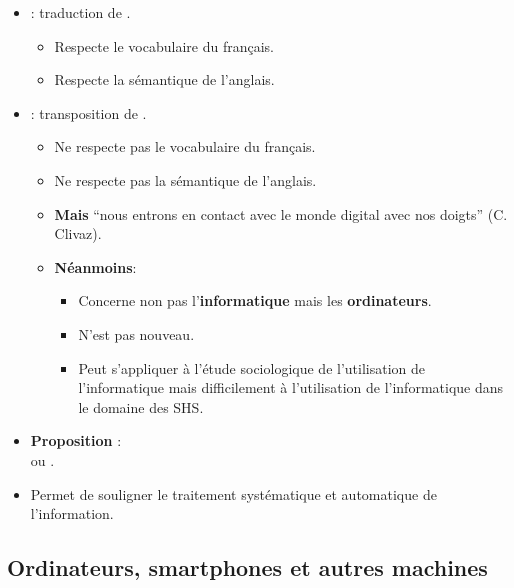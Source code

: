 \begin{slide}
	\begin{itemize}
		\item {} : traduction de .
		\begin{itemize}
			\item Respecte le vocabulaire du français.
			\item Respecte la sémantique de l'anglais.
		\end{itemize}
		
		\item {} : transposition de .
			\begin{itemize}
				\item Ne respecte pas le vocabulaire du français.
				\item Ne respecte pas la sémantique de l'anglais.
				\item \textbf{Mais} \enquote{nous entrons en contact avec le monde digital avec nos doigts} (C. Clivaz). %

				\item \textbf{Néanmoins}: %
				\begin{itemize}
					\item Concerne non pas l'\textbf{informatique} mais les \textbf{ordinateurs}.
					\item N'est pas nouveau.
					\item Peut s'appliquer à l'étude sociologique de l'utilisation de l'informatique mais difficilement à l'utilisation de l'informatique dans le domaine des SHS.
				\end{itemize}
			\end{itemize}
	\end{itemize}
\end{slide}
\begin{slide}
	\begin{itemize}
		\item \textbf{Proposition} :\\  ou .
		\item Permet de souligner le traitement systématique et automatique de l'information.
	\end{itemize}
\end{slide}
\subsection{Ordinateurs, smartphones et autres machines}


